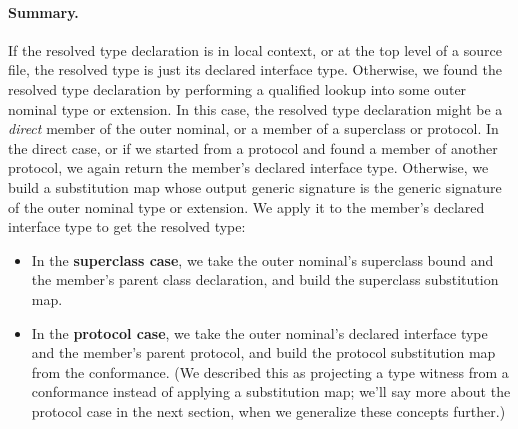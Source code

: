 \documentclass[../generics]{subfiles}
\begin{document}
\paragraph{Summary.} If the resolved type declaration is in local context, or at the top level of a source file, the resolved type is just its declared interface type. Otherwise, we found the resolved type declaration by performing a qualified lookup into some outer nominal type or extension. In this case, the resolved type declaration might be a \emph{direct} member of the outer nominal, or a member of a superclass or protocol. In the direct case, or if we started from a protocol and found a member of another protocol, we again return the member's declared interface type. Otherwise, we build a substitution map whose output generic signature is the generic signature of the outer nominal type or extension. We apply it to the member's declared interface type to get the resolved type:
\begin{itemize}
\item
In the \textbf{superclass case}, we take the outer nominal's superclass bound and the member's parent class declaration, and build the superclass substitution map.
\item
In the \textbf{protocol case}, we take the outer nominal's declared interface type and the member's parent protocol, and build the protocol substitution map from the conformance. (We described this as projecting a type witness from a conformance instead of applying a substitution map; we'll say more about the protocol case in the next section, when we generalize these concepts further.)
\end{itemize}
\end{document}
